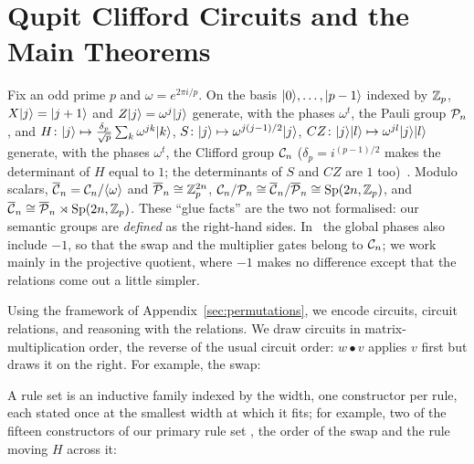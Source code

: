 \section{Qupit Clifford Circuits and the Main Theorems}\label{sec:background}

Fix an odd prime $p$ and $\omega = e^{2\pi i/p}$.  On the basis
$|0\rangle,\dots,|p-1\rangle$ indexed by $\mathbb{Z}_p$, $X|j\rangle = |j+1\rangle$ and
$Z|j\rangle = \omega^{j}|j\rangle$ generate, with the phases $\omega^t$, the
Pauli group $\mathcal{P}_{n}$, and $H\colon |j\rangle \mapsto
\tfrac{\delta_p}{\sqrt p}\sum_k \omega^{jk}|k\rangle$, $S\colon |j\rangle
\mapsto \omega^{j(j-1)/2}|j\rangle$, $CZ\colon |j\rangle|l\rangle \mapsto
\omega^{jl}|j\rangle|l\rangle$ generate, with the phases $\omega^t$, the
Clifford group $\mathcal{C}_{n}$ ($\delta_p = i^{(p-1)/2}$ makes the
determinant of $H$ equal to $1$; the determinants of $S$ and $CZ$ are
$1$ too)~\cite{bian2026qudit}.  Modulo scalars, $\overline{\mathcal{C}}_{n} =
\mathcal{C}_{n}/\langle\omega\rangle$ and $\overline{\mathcal{P}}_{n} \cong \mathbb{Z}_p^{2n}$, $\mathcal{C}_{n}/\mathcal{P}_{n} \cong \overline{\mathcal{C}}_{n}/\overline{\mathcal{P}}_{n} \cong \mathrm{Sp}(2n,\mathbb{Z}_p)$, and $\overline{\mathcal{C}}_{n} \cong
\overline{\mathcal{P}}_{n} \rtimes \mathrm{Sp}(2n,\mathbb{Z}_p)$.  These ``glue facts'' are the two not formalised:
our semantic groups are \emph{defined} as the right-hand sides.
In~\cite{bian2026qudit} the global phases also include $-1$, so that
the swap and the multiplier gates belong to $\mathcal{C}_{n}$; we work mainly
in the projective quotient, where $-1$ makes no difference except that
the relations come out a little simpler.

Using the framework of Appendix~\ref{sec:permutations}, we encode
circuits, circuit relations, and reasoning with the relations.  We
draw circuits in matrix-multiplication order, the reverse of the usual
circuit order: $w \bullet v$ applies $v$ first but draws it on the
right.  For example, the swap:

\noindent\begin{minipage}[c]{0.56\textwidth}

\end{minipage}\hfill
\begin{minipage}[c]{0.42\textwidth}\centering
{}
\end{minipage}

\noindent A rule set is an inductive family indexed by the width, one
constructor per rule, each stated once at the smallest width at which
it fits; for example, two of the fifteen constructors of our primary
rule set , the order of the swap and the
rule moving $H$ across it:

\noindent\begin{minipage}[c]{0.56\textwidth}

\end{minipage}\hfill
\begin{minipage}[c]{0.42\textwidth}\centering
{}\\[3pt]
\end{minipage}

